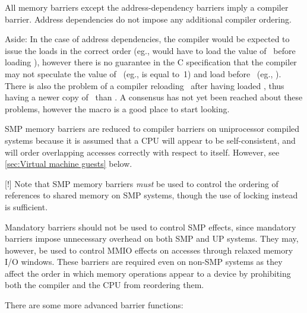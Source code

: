 All memory barriers except the address-dependency barriers imply a compiler
barrier.
Address dependencies do not impose any additional compiler ordering.

Aside:
In the case of address dependencies, the compiler would be expected
to issue the loads in the correct order (eg.,  would have to load
the value of~ before loading ), however there is no guarantee in
the C specification that the compiler may not speculate the value of~
(eg., is equal to~1) and load  before~ (eg.,
).
There is also the problem of a compiler reloading~ after having loaded
, thus having a newer copy of~ than .
A consensus has not yet been reached about these problems, however the
 macro is a good place to start looking.

SMP memory barriers are reduced to compiler barriers on uniprocessor compiled
systems because it is assumed that a CPU will appear to be self-consistent,
and will order overlapping accesses correctly with respect to itself.
However, see \cref{sec:Virtual machine guests} below.

[!] Note that SMP memory barriers \emph{must} be used to control the ordering of
references to shared memory on SMP systems, though the use of locking instead
is sufficient.

Mandatory barriers should not be used to control SMP effects, since mandatory
barriers impose unnecessary overhead on both SMP and UP systems.
They may, however, be used to control MMIO effects on accesses through
relaxed memory I/O windows.
These barriers are required even on non-SMP systems as they affect the order
in which memory operations appear to a device by prohibiting both the
compiler and the CPU from reordering them.


There are some more advanced barrier functions:

